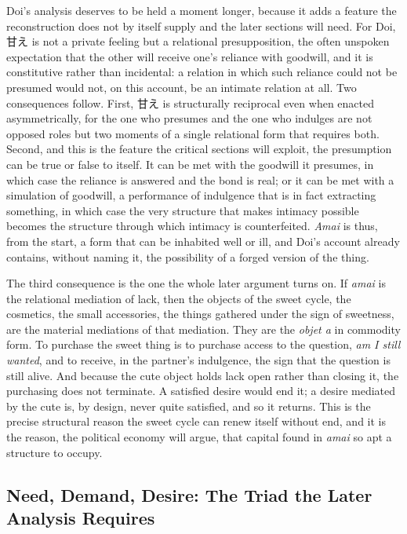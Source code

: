 \documentclass[11pt,a4paper]{article}
\newcommand{\cn}[1]{{\cjkfont #1}}
\begin{document}
Doi's analysis deserves to be held a moment longer, because it adds a feature the reconstruction does not by itself supply and the later sections will need. For Doi, \cn{甘え} is not a private feeling but a relational presupposition, the often unspoken expectation that the other will receive one's reliance with goodwill, and it is constitutive rather than incidental: a relation in which such reliance could not be presumed would not, on this account, be an intimate relation at all. Two consequences follow. First, \cn{甘え} is structurally reciprocal even when enacted asymmetrically, for the one who presumes and the one who indulges are not opposed roles but two moments of a single relational form that requires both. Second, and this is the feature the critical sections will exploit, the presumption can be true or false to itself. It can be met with the goodwill it presumes, in which case the reliance is answered and the bond is real; or it can be met with a simulation of goodwill, a performance of indulgence that is in fact extracting something, in which case the very structure that makes intimacy possible becomes the structure through which intimacy is counterfeited. \textit{Amai} is thus, from the start, a form that can be inhabited well or ill, and Doi's account already contains, without naming it, the possibility of a forged version of the thing.

The third consequence is the one the whole later argument turns on. If \textit{amai} is the relational mediation of lack, then the objects of the sweet cycle, the cosmetics, the small accessories, the things gathered under the sign of sweetness, are the material mediations of that mediation. They are the \textit{objet a} in commodity form. To purchase the sweet thing is to purchase access to the question, \textit{am I still wanted}, and to receive, in the partner's indulgence, the sign that the question is still alive. And because the cute object holds lack open rather than closing it, the purchasing does not terminate. A satisfied desire would end it; a desire mediated by the cute is, by design, never quite satisfied, and so it returns. This is the precise structural reason the sweet cycle can renew itself without end, and it is the reason, the political economy will argue, that capital found in \textit{amai} so apt a structure to occupy.

\subsection{Need, Demand, Desire: The Triad the Later Analysis Requires}
\end{document}
